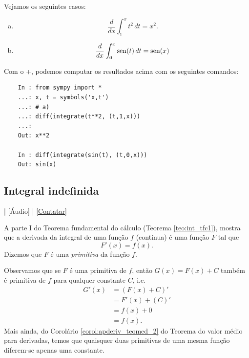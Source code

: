 \begin{ex}
  Vejamos os seguintes casos:
  \begin{enumerate}[a)]
  \item
    \begin{equation}
      \frac{d}{dx}\int_1^x t^2\,dt = x^2.
    \end{equation}
  \item
    \begin{equation}
      \frac{d}{dx}\int_0^x \operatorname{sen}(t)\,dt = \operatorname{sen}(x)
    \end{equation}
  \end{enumerate}

  \ifispython
  Com o {\python}+{\sympy}, podemos computar os resultados acima com os seguintes comandos:
  \begin{lstlisting}
    In : from sympy import *
    ...: x, t = symbols('x,t')
    ...: # a)
    ...: diff(integrate(t**2, (t,1,x)))
    ...: 
    Out: x**2
    
    In : diff(integrate(sin(t), (t,0,x)))
    Out: sin(x)
  \end{lstlisting}
  \fi
\end{ex}

\subsection{Integral indefinida}

\begin{flushright}
  [Vídeo] | [Áudio] | \href{https://phkonzen.github.io/notas/contato.html}{[Contatar]}
\end{flushright}

A parte I do Teorema fundamental do cálculo (Teorema \ref{teo:int_tfc1}), mostra que a derivada da integral de uma função $f$ (contínua) é uma função $F$ tal que
\begin{equation}
  F'(x) = f(x).
\end{equation}
Dizemos que $F$ é uma \emph{primitiva} da função $f$.

Observamos que se $F$ é uma primitiva de $f$, então $G(x) = F(x) + C$ também é primitiva de $f$ para qualquer constante $C$, i.e.
\begin{align}
  G'(x) &= (F(x) + C)' \\
        &= F'(x) + (C)' \\
        &= f(x) + 0 \\
        &= f(x).
\end{align}
Mais ainda, do Corolário \ref{corol:apderiv_teomed_2} do Teorema do valor médio para derivadas, temos que quaisquer duas primitivas de uma mesma função diferem-se apenas uma constante.

